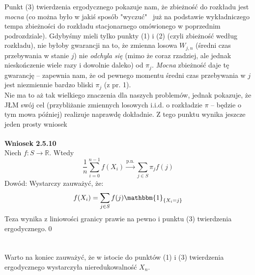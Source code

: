 \documentclass[a4paper]{article}
\begin{document}
Punkt (3) twierdzenia ergodycznego pokazuje nam, że zbieżność do rozkładu jest \textit{mocna} (co można było w jakiś sposób "wyczuć" \, już na podstawie wykładniczego tempa zbieżności do rozkładu stacjonarnego omówionego w poprzednim podrozdziale). Gdybyśmy mieli tylko punkty (1) i (2) (czyli zbieżność według rozkładu), nie byłoby gwarancji na to, że zmienna losowa $W_{j,n}$ (średni czas przebywania w stanie $j$) nie \textit{odchyla się} (mimo że coraz rzadziej, ale jednak nieskończenie wiele razy i dowolnie daleko) od $\pi_j$. \textit{Mocna} zbieżność daje tę gwarancję – zapewnia nam, że od pewnego momentu średni czas przebywania w $j$ jest niezmiennie bardzo bliski $\pi_j$ (z pr. 1).\\
Nie ma to aż tak wielkiego znaczenia dla naszych problemów, jednak pokazuje, że JŁM swój cel (przybliżanie zmiennych losowych i.i.d. o rozkładzie $\pi$ – będzie o tym mowa później) realizuje naprawdę dokładnie. Z tego punktu wynika jeszcze jeden prosty wniosek
\\
\\
\textbf{Wniosek 2.5.10}\\
Niech $f: S \to \mathbb{R}$. Wtedy
$$ \frac{1}{n} \sum\limits_{i=0}^{n-1} f(X_i) \overset{\text{p.n.}}{\to} \sum\limits_{j \in S} \pi_j f(j)$$
Dowód: Wystarczy zauważyć, że:
$$ f(X_i) = \sum\limits_{j \in S} f(j)\mathbbm{1}_{\{X_i = j\}}$$
Teza wynika z liniowości granicy prawie na pewno i punktu (3) twierdzenia ergodycznego.\qed\\\\\\
Warto na koniec zauważyć, że w istocie do punktów (1) i (3) twierdzenia ergodycznego wystarczyła nieredukowalność $X_n$. \\
\end{document}
